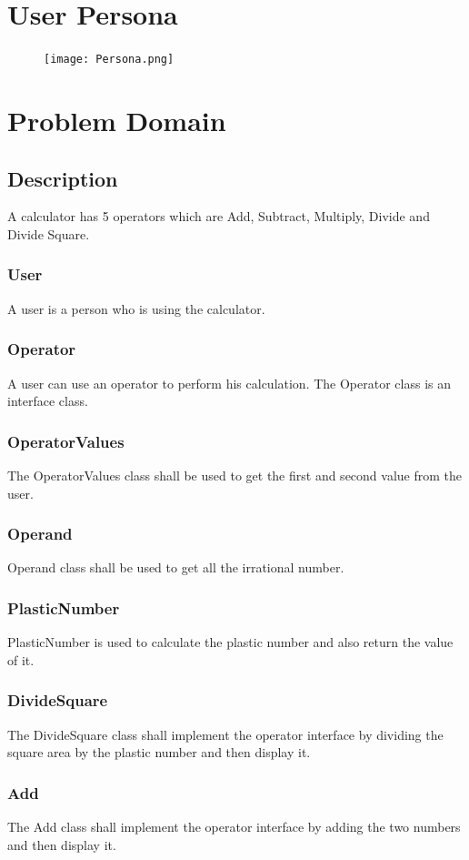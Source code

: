 \documentclass{report}
\begin{document}
\chapter{User Persona}
\begin{figure}[h!]
\centering
\texttt{[image: Persona.png]}
\label{fig:squares}
\end{figure}
\newpage
\chapter{Problem Domain}

\newpage
\section{Description}
A calculator has 5 operators which are Add, Subtract, Multiply, Divide and Divide Square.
\subsection{User}
A user is a person who is using the calculator.
\subsection{Operator}
A user can use an operator to perform his calculation.\newline
\newline The Operator class is an interface class.
\subsection{OperatorValues}
The OperatorValues class shall be used to get the first and second value from the user.
\subsection{Operand}
Operand class shall be used to get all the irrational number. 
\subsection{PlasticNumber}
PlasticNumber is used to calculate the plastic number and also return the value of it. 
\subsection{DivideSquare}
The DivideSquare class shall implement the operator interface by dividing the square area by the plastic number and then display it.
\subsection{Add}
The Add class shall implement the operator interface by adding the two numbers and then display it.
\end{document}
